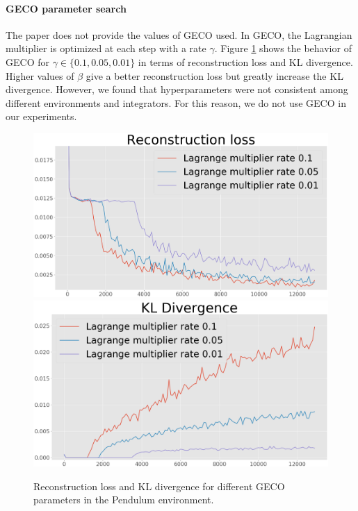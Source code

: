 \paragraph{GECO parameter search} \label{sec:hyperparam_search} The paper does not provide the values of GECO \cite{geco} used. In GECO, the Lagrangian multiplier is optimized at each step with a rate $\gamma$.
Figure \ref{fig:geco_search} shows the behavior of GECO for $\gamma \in \{0.1, 0.05, 0.01\}$ in terms of reconstruction loss and KL divergence. Higher values of $\beta$ give a better reconstruction loss but greatly increase the KL divergence. %
However, we found that hyperparameters were not consistent among different environments and integrators. For this reason, we do not use GECO in our experiments.
\begin{figure}[]
\centering
  \includegraphics[width=0.8\linewidth]{pictures/parameter_comparisons/lagrange_multiplier_comparison_rec_loss.png}
\endminipage\hfill
{}
\centering
  \includegraphics[width=0.8\linewidth]{pictures/parameter_comparisons/lagrange_multiplier_comparison_kld.png}
\endminipage
\caption{Reconstruction loss and KL divergence for different GECO parameters in the Pendulum environment.}
\label{fig:geco_search}
\end{figure}


